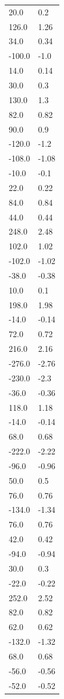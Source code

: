 \begin{longtable}{ll}
20.0 & 0.2 \\
126.0 & 1.26 \\
34.0 & 0.34 \\
-100.0 & -1.0 \\
14.0 & 0.14 \\
30.0 & 0.3 \\
130.0 & 1.3 \\
82.0 & 0.82 \\
90.0 & 0.9 \\
-120.0 & -1.2 \\
-108.0 & -1.08 \\
-10.0 & -0.1 \\
22.0 & 0.22 \\
84.0 & 0.84 \\
44.0 & 0.44 \\
248.0 & 2.48 \\
102.0 & 1.02 \\
-102.0 & -1.02 \\
-38.0 & -0.38 \\
10.0 & 0.1 \\
198.0 & 1.98 \\
-14.0 & -0.14 \\
72.0 & 0.72 \\
216.0 & 2.16 \\
-276.0 & -2.76 \\
-230.0 & -2.3 \\
-36.0 & -0.36 \\
118.0 & 1.18 \\
-14.0 & -0.14 \\
68.0 & 0.68 \\
-222.0 & -2.22 \\
-96.0 & -0.96 \\
50.0 & 0.5 \\
76.0 & 0.76 \\
-134.0 & -1.34 \\
76.0 & 0.76 \\
42.0 & 0.42 \\
-94.0 & -0.94 \\
30.0 & 0.3 \\
-22.0 & -0.22 \\
252.0 & 2.52 \\
82.0 & 0.82 \\
62.0 & 0.62 \\
-132.0 & -1.32 \\
68.0 & 0.68 \\
-56.0 & -0.56 \\
-52.0 & -0.52 \\

\end{longtable}
